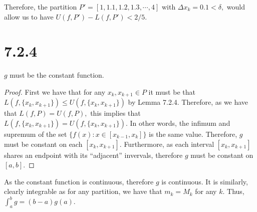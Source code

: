 \documentclass[10pt]{article}
\begin{document}
Therefore, the partition $P'=[1,1.1,1.2,1.3,\cdots,4]$ with $\Delta x_k = 0.1<\delta,$  would allow us to have $U(f,P')-L(f,P')<2/5.$


\section*{7.2.4}

$g$ must be the constant function.

\begin{proof}
    First we have that for any $ x_k, x_{k+1}\in P$ it must be that $L(f,\{x_k, x_{k+1}\})\le U(f,\{x_k, x_{k+1}\})$ by Lemma 7.2.4. Therefore, as we have that $L(f,P)=U(f,P),$ this implies that $L(f,\{x_k, x_{k+1}\}) =  U(f,\{x_k, x_{k+1}\}).$ In other words, the infimum and supremum of the set $\{f(x):x\in[x_{k-1},x_k]\}$ is the same value. Therefore, $g$ must be constant on each $[x_k,x_{k+1}].$ Furthermore, as each interval  $[x_k,x_{k+1}]$ shares an endpoint with its ``adjacent'' invervals, therefore $g$ must be constant on $[a,b].$
\end{proof}

As the constant function is continuous, therefore $g$ is continuous. It is similarly, clearly integrable as for any partition, we have that $m_k= M_k$ for any $k$. Thus, $\int_a^b g= (b-a)g(a).$ 
\end{document}
